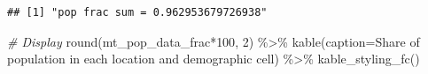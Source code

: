 \documentclass[
]{book}
\newenvironment{Shaded}{\begin{snugshade}}{\end{snugshade}}
\newcommand{\AttributeTok}[1]{\textcolor[rgb]{0.77,0.63,0.00}{#1}}
\newcommand{\CommentTok}[1]{\textcolor[rgb]{0.56,0.35,0.01}{\textit{#1}}}
\newcommand{\DecValTok}[1]{\textcolor[rgb]{0.00,0.00,0.81}{#1}}
\newcommand{\FunctionTok}[1]{\textcolor[rgb]{0.00,0.00,0.00}{#1}}
\newcommand{\NormalTok}[1]{#1}
\newcommand{\SpecialCharTok}[1]{\textcolor[rgb]{0.00,0.00,0.00}{#1}}
\newcommand{\StringTok}[1]{\textcolor[rgb]{0.31,0.60,0.02}{#1}}
\begin{document}
\begin{verbatim}
## [1] "pop frac sum = 0.962953679726938"
\end{verbatim}

\begin{Shaded}
\begin{Highlighting}[]
\CommentTok{\# Display}
\FunctionTok{round}\NormalTok{(mt\_pop\_data\_frac}\SpecialCharTok{*}\DecValTok{100}\NormalTok{, }\DecValTok{2}\NormalTok{) }\SpecialCharTok{\%\textgreater{}\%} 
  \FunctionTok{kable}\NormalTok{(}\AttributeTok{caption=}\StringTok{\textquotesingle{}Share of population in each location and demographic cell\textquotesingle{}}\NormalTok{) }\SpecialCharTok{\%\textgreater{}\%} 
  \FunctionTok{kable\_styling\_fc}\NormalTok{()}
\end{Highlighting}
\end{Shaded}
\end{document}
